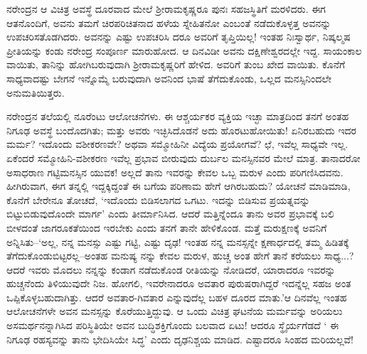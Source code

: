 ನರೇಂದ್ರನ ಆ ವಿಚಿತ್ರ ಅವಸ್ಥೆ ದೂರವಾದ ಮೇಲೆ ಶ್ರೀರಾಮಕೃಷ್ಣರೂ ಪುನಃ ಸಹಜಸ್ಥಿತಿಗೆ ಮರಳಿದರು. ಈಗ ಆತನೊಂದಿಗೆ, ಅವನು ತಮಗೆ ಚಿರಪರಿಚಿತನಾದ ಹಳೆಯ ಸ್ನೇಹಿತನೋ ಎಂಬಂತೆ ನಡೆದುಕೊಳ್ಳತ್ತ ಅವನನ್ನು ಉಪಚರಿಸತೊಡಗಿದರು. ಅವನನ್ನು ಎಷ್ಟು ಉಪಚರಿಸಿ ದರೂ ಅವರಿಗೆ ತೃಪ್ತಿಯಿಲ್ಲ! ಇಂತಹ ನಿಃಸ್ವಾರ್ಥ, ನಿಷ್ಕಲ್ಮಷ ಪ್ರೀತಿಯನ್ನು ಕಂಡು ನರೇಂದ್ರ ಸಂಪೂರ್ಣ ಮಾರುಹೋದ. ಆ ದಿನವಿಡೀ ಅವನು ದಕ್ಷಿಣೇಶ್ವರದಲ್ಲೇ ಇದ್ದ. ಸಾಯಂಕಾಲ ವಾಯಿತು, ತಾನಿನ್ನು ಹೋಗಿಬರುವುದಾಗಿ ಶ್ರೀರಾಮಕೃಷ್ಣರಿಗೆ ಹೇಳಿದ. ಅವರಿಗೆ ತುಂಬ ಖೇದ ವಾಯಿತು. ಕೊನೆಗೆ ಸಾಧ್ಯವಾದಷ್ಟು ಬೇಗನೆ ಇನ್ನೊಮ್ಮೆ ಬರುವುದಾಗಿ ಅವನಿಂದ ಭಾಷೆ ತೆಗೆದುಕೊಂಡು, ಒಲ್ಲದ ಮನಸ್ಸಿನಿಂದಲೇ ಅನುಮತಿಯಿತ್ತರು.

ನರೇಂದ್ರನ ತಲೆಯಲ್ಲಿ ನೂರೆಂಟು ಆಲೋಚನೆಗಳು. ಈ ಆಶ್ಚರ್ಯಕರ ವ್ಯಕ್ತಿಯ ಇಚ್ಛಾ ಮಾತ್ರದಿಂದ ತನಗೆ ಅಂತಹ ನಿಗೂಢ ಅವಸ್ಥೆ ಬಂದೊದಗಿತು; ಮತ್ತು ಅವರು ಇಚ್ಛಿಸಿದೊಡನೆ ಅದು ಹೊರಟುಹೋಯಿತು! ಏನಿರಬಹುದು ಇದರ ಮರ್ಮ? ಇದೊಂದು ವಶೀಕರಣವೇ? ಅಥವಾ ಸಮ್ಮೋಹಿನೀ ವಿದ್ಯೆಯ ಪ್ರಯೋಗವೆ? ಛೆ, ಇವೆಲ್ಲ ಸಾಧ್ಯವೇ ಇಲ್ಲ. ಏಕೆಂದರೆ ಸಮ್ಮೋಹಿನಿ-ವಶೀಕರಣ ಇವೆಲ್ಲ ಪ್ರಭಾವ ಬೀರುವುದು ದುರ್ಬಲ ಮನಸ್ಸಿನವರ ಮೇಲೆ ಮಾತ್ರ. ತಾನಾದರೋ ಅಸಾಧರಾಣ ಗಟ್ಟಿಮನಸ್ಸಿನ ಯುವಕ! ಅಲ್ಲದೆ ತಾನು ಇವರನ್ನು ಕೇವಲ ಒಬ್ಬ ಮರುಳ ಎಂದು ಪರಿಗಣಿಸಿದವನು. ಹೀಗಿರುವಾಗ, ಈಗ ತನ್ನಲ್ಲಿ ಇದ್ದಕ್ಕಿದ್ದಂತೆ ಈ ಬಗೆಯ ಪರಿಣಾಮ ಹೇಗೆ ಆಗಿರಬಹುದು? ಯೋಚನೆ ಮಾಡಿಮಾಡಿ, ಕೊನೆಗೆ ಬೇರೇನೂ ತೋಚದೆ, ‘ಇದೊಂದು ಬಿಡಿಸಲಾಗದ ಒಗಟು. ಇದನ್ನು ಬಿಡಿಸುವ ಪ್ರಯತ್ನವನ್ನು ಬಿಟ್ಟುಬಿಡುವುದೊಂದೇ ಮಾರ್ಗ’ ಎಂದು ತೀರ್ಮಾನಿಸಿದ. ಆದರೆ ಮತ್ತಿನ್ನೆಂದೂ ತಾನು ಅವರ ಪ್ರಭಾವಕ್ಕೆ ಬಲಿ ಬೀಳದಂತೆ ಜಾಗರೂಕತೆಯಿಂದ ಇರಬೇಕು ಎಂದು ತನಗೆ ತಾನೇ ಹೇಳಿಕೊಂಡ. ಮತ್ತೆ ಮರುಕ್ಷಣಕ್ಕೆ ಅವನಿಗೆ ಅನ್ನಿಸಿತು–‘ಅಲ್ಲ, ನನ್ನ ಮನಸ್ಸು ಎಷ್ಟು ಗಟ್ಟಿ, ಎಷ್ಟು ದೃಢ! ಇಂತಹ ನನ್ನ ಮನಸ್ಸನ್ನೇ ಕ್ಷಣಾರ್ಧದಲ್ಲಿ ತಮ್ಮ ಹಿಡಿತಕ್ಕೆ ತೆಗೆದುಕೊಂಡುಬಿಟ್ಟರಲ್ಲ–ಅಂತಹ ಮನುಷ್ಯ ನನ್ನು ಕೇವಲ ಮರುಳ, ಹುಚ್ಚ ಅಂತ ಹೇಗೆ ತಾನೆ ಕರೆಯಲು ಸಾಧ್ಯ...? ಆದರೆ ಇವರು ಮೊದಲು ನನ್ನನ್ನು ಕಂಡಾಗ ನಡೆದುಕೊಂಡ ರೀತಿಯನ್ನು ನೋಡಿದರೆ, ಯಾರಾದರೂ ಇವರನ್ನು ಹುಚ್ಚನೆಂದು ತಿಳಿಯುವುದೇ ನಿಜ. ಹೋಗಲಿ, ಇವರೇನಾದರೂ ಅವತಾರ ಪುರುಷರಾಗಿದ್ದರೆ ಇದನ್ನೆಲ್ಲ ಸಹಜ ಅಂತ ಒಪ್ಪಿಕೊಳ್ಳಬಹುದಾಗಿತ್ತು. ಆದರೆ ಅವತಾರ-ಗಿವತಾರ ಎನ್ನುವುದೆಲ್ಲ ಬಹಳ ದೂರದ ಮಾತು.’ಆ ದಿನವೆಲ್ಲ ಇಂತಹ ಆಲೋಚನೆಗಳೇ ಅವನ ಮನಸ್ಸನ್ನು ಕೊರೆಯುತ್ತಿದ್ದುವು. ಆ ಒಂದು ವಿಚಿತ್ರ ಘಟನೆಯ ಮರ್ಮವನ್ನು ಅರಿಯಲು ಅಸಮರ್ಥನನ್ನಾಗಿಸಿದ ಪರಿಸ್ಥಿತಿಯೇ ಅವನ ಬುದ್ಧಿಶಕ್ತಿಗೊಂದು ಬಲವಾದ ಏಟು! ಆದರೂ ಸ್ಥೈರ್ಯಗೆಡದೆ ‘ ಈ ನಿಗೂಢ ರಹಸ್ಯವನ್ನು ತಾನು ಭೇದಿಸಿಯೇ ಸಿದ್ಧ’ ಎಂದು ದೃಢನಿಶ್ಚಯ ಮಾಡಿದ. ಎಷ್ಟಾದರೂ ಸಿಂಹದ ಮರಿಯಲ್ಲವೆ!

